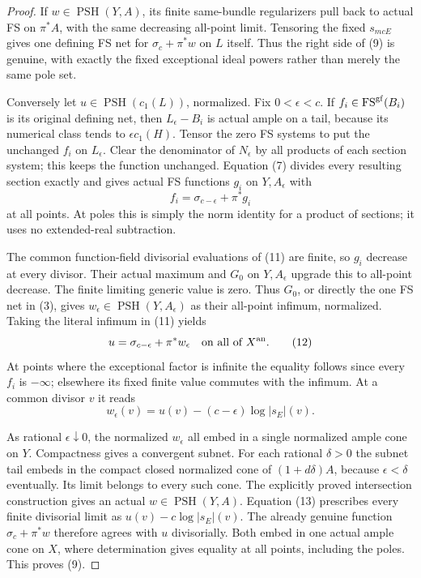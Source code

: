 \documentclass[11pt]{article}
\newcommand{\PSH}{\operatorname{PSH}}
\newcommand{\FS}{\operatorname{FS}}
\begin{document}
\begin{proof}
If $w\in\PSH(Y,A)$, its finite same-bundle regularizers pull
back to actual FS on $\pi^*A$, with the same decreasing
all-point limit. Tensoring the fixed $s_{mcE}$ gives one defining
FS net for $\sigma_c+\pi^*w$ on $L$ itself. Thus the right
side of (9) is genuine, with exactly the fixed exceptional ideal
powers rather than merely the same pole set.

Conversely let $u\in\PSH(c_1(L))$, normalized. Fix
$0<\epsilon<c$. If $f_i\in\FS^{\rm gf}(B_i)$ is its original
defining net, then $L_\epsilon-B_i$ is actual ample on a tail,
because its numerical class tends to $\epsilon c_1(H)$.
Tensor the zero FS systems to put the unchanged $f_i$ on
$L_\epsilon$. Clear the denominator of $N_\epsilon$ by
all products of each section system; this keeps the function
unchanged. Equation (7) divides every resulting section exactly
and gives actual FS functions $g_i$ on $Y,A_\epsilon$ with
\[
                 f_i=\sigma_{c-\epsilon}+\pi^*g_i        \tag{11}
\]
at all points. At poles this is simply the norm identity for a
product of sections; it uses no extended-real subtraction.

The common function-field divisorial evaluations of (11) are
finite, so $g_i$ decrease at every divisor. Their actual maximum
and $G_0$ on $Y,A_\epsilon$ upgrade this to all-point decrease.
The finite limiting generic value is zero. Thus $G_0$, or directly
the one FS net in (3), gives $w_\epsilon\in\PSH(Y,A_\epsilon)$
as their all-point infimum, normalized. Taking the literal infimum
in (11) yields
\[
 u=\sigma_{c-\epsilon}+\pi^*w_\epsilon
 \quad\hbox{on all of }X^{\rm an}.                         \tag{12}
\]
At points where the exceptional factor is infinite the equality
follows since every $f_i$ is $-\infty$; elsewhere its fixed finite
value commutes with the infimum. At a common divisor $v$ it reads
\[
 w_\epsilon(v)=u(v)-(c-\epsilon)\log|s_E|(v).              \tag{13}
\]

As rational $\epsilon\downarrow0$, the normalized $w_\epsilon$
all embed in a single normalized ample cone on $Y$. Compactness
gives a convergent subnet. For each rational $\delta>0$ the
subnet tail embeds in the compact closed normalized cone of
$(1+d\delta)A$, because $\epsilon<\delta$ eventually.
Its limit belongs to every such cone. The explicitly proved
intersection construction gives an actual $w\in\PSH(Y,A)$.
Equation (13) prescribes every finite divisorial limit as
$u(v)-c\log|s_E|(v)$. The already genuine function
$\sigma_c+\pi^*w$ therefore agrees with $u$ divisorially.
Both embed in one actual ample cone on $X$, where determination
gives equality at all points, including the poles. This proves (9).


\end{proof}
\end{document}

